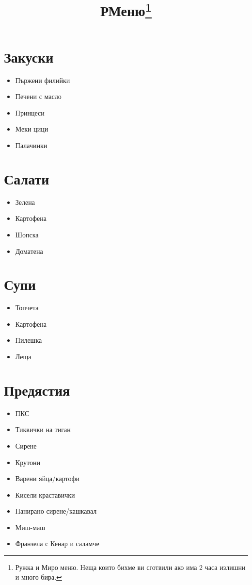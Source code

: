 \documentclass{article}
\title{РМеню\footnote{Ружка и Миро меню. Неща които бихме ви сготвили ако има 2 часа излишни и много бира.}}
\newenvironment{mylist}
{
  \begin{itemize}
  \setlength{\itemsep}{1pt}
  \setlength{\parskip}{0pt}
  \setlength{\parsep}{0pt}
}
{
\end{itemize}
}
\begin{document}
\maketitle
\begin{multicols}{2}
\section{Закуски}
\begin{mylist}
    \item{Пържени филийки}
    \item{Печени с масло}
    \item{Принцеси}
    \item{Меки цици}
    \item{Палачинки}
\end{mylist}

\section{Салати}
\begin{mylist}
    \item{Зелена}
    \item{Картофена}
    \item{Шопска}
    \item{Доматена}
\end{mylist}

\section{Супи}
\begin{mylist}
    \item{Топчета}
    \item{Картофена}
    \item{Пилешка}
    \item{Леща}
\end{mylist}

\section{Предястия}
\begin{mylist}
    \item{ПКС}
    \item{Тиквички на тиган}
    \item{Сирене}
    \item{Крутони}
    \item{Варени яйца/картофи}
    \item{Кисели краставички}
    \item{Панирано сирене/кашкавал}
    \item{Миш-маш}
    \item{Франзела с Кенар и саламче}
\end{mylist}


\end{multicols}
\end{document}
